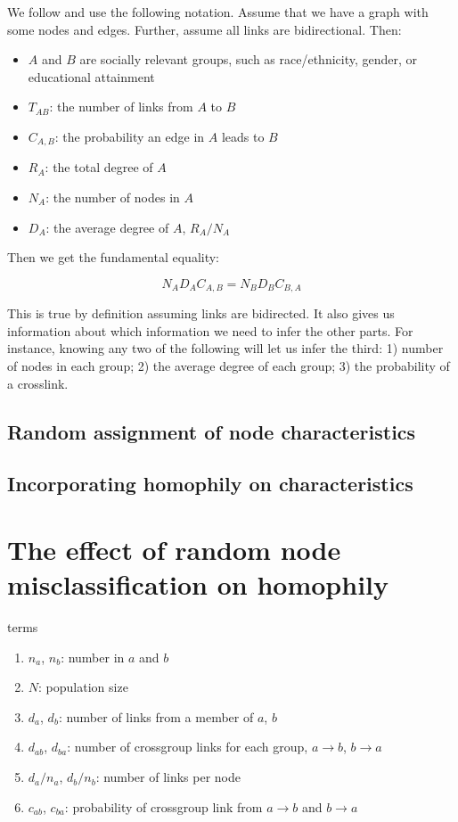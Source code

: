 \documentclass[a4paper]{article}
\begin{document}
We follow \cite{Salganik2004} and use the following notation. Assume that we have a graph with some nodes and edges. Further, assume all links are bidirectional. Then:

\begin{itemize}
\item $A$ and $B$ are socially relevant groups, such as race/ethnicity, gender, or educational attainment
\item $T_{AB}$: the number of links from $A$ to $B$
\item $C_{A,B}$: the probability an edge in $A$ leads to $B$
\item $R_A$: the total degree of $A$
\item $N_A$: the number of nodes in $A$
\item $D_A$: the average degree of $A$, $R_A / N_A$
\end{itemize}

Then we get the fundamental equality:

\begin{equation}
N_A D_A C_{A,B} = N_B D_B C_{B,A}
\end{equation}

This is true by definition assuming links are bidirected. It also gives us information about which information we need to infer the other parts. For instance, knowing any two of the following will let us infer the third: 1) number of nodes in each group; 2) the average degree of each group; 3) the probability of a crosslink.



\subsection{Random assignment of node characteristics}

\subsection{Incorporating homophily on characteristics}


\section{The effect of random node misclassification on homophily}

terms

\begin{enumerate}
\item $n_a$, $n_b$: number in $a$ and $b$
\item $N$: population size
\item $d_a$, $d_b$: number of links from a member of $a$, $b$
\item $d_{ab}$, $d_{ba}$: number of crossgroup links for each group, $a\to b$, $b\to a$
\item $d_a/n_a$, $d_b/n_b$: number of links per node
\item $c_{ab}$, $c_{ba}$: probability of crossgroup link from $a\to b$ and $b\to a$
\end{enumerate}
\end{document}
